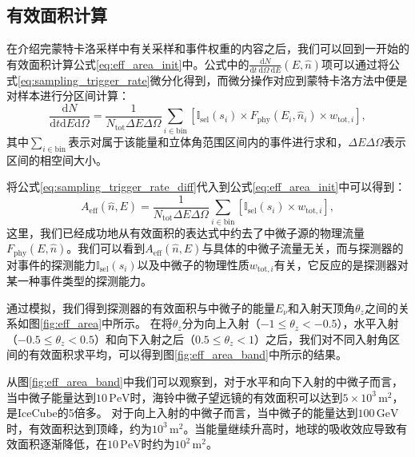 \subsection{有效面积计算}

在介绍完蒙特卡洛采样中有关采样和事件权重的内容之后，我们可以回到一开始的有效面积计算公式\ref{eq:eff_area_init}中。公式中的$\frac{\mathrm{d}N}{\mathrm{d}t ~\mathrm{d}\Omega ~\mathrm{d}E}(E, \hat{n})$项可以通过将公式\ref{eq:sampling_trigger_rate}微分化得到，而微分操作对应到蒙特卡洛方法中便是对样本进行分区间计算：
\begin{equation}
    \frac{\mathrm{d}N}{\mathrm{d}t \mathrm{d}E \mathrm{d}\Omega} = 
    \frac{1}{N_\mathrm{tot} \Delta E \Delta\Omega} \sum_{i \in \mathrm{bin}} \left[ 
    \mathbb{I}_\mathrm{sel}(s_i) \times 
    F_\mathrm{phy} (E_i, \hat{n}_i) \times
    w_{\mathrm{tot}, i} \right] ,
\label{eq:sampling_trigger_rate_diff}
\end{equation}
其中$\sum_{i \in \mathrm{bin}}$表示对属于该能量和立体角范围区间内的事件进行求和，$\Delta E \Delta\Omega$表示区间的相空间大小。

将公式\ref{eq:sampling_trigger_rate_diff}代入到公式\ref{eq:eff_area_init}中可以得到：
\begin{equation}
    A_\mathrm{eff} (\hat{n}, E) = \frac{1}{N_\mathrm{tot} \Delta E \Delta\Omega} \sum_{i \in \mathrm{bin}} \left[ 
    \mathbb{I}_\mathrm{sel}(s_i) \times 
    w_{\mathrm{tot}, i} \right] ,
    \label{eq:eff_area}
\end{equation}
这里，我们已经成功地从有效面积的表达式中约去了中微子源的物理流量$F_\mathrm{phy} (E, \hat{n})$。我们可以看到$A_\mathrm{eff} (\hat{n}, E)$与具体的中微子流量无关，而与探测器的对事件的探测能力$\mathbb{I}_\mathrm{sel}(s_i)$以及中微子的物理性质$w_{\mathrm{tot}, i}$有关，它反应的是探测器对某一种事件类型的探测能力。

通过模拟，我们得到探测器的有效面积与中微子的能量$E_\nu$和入射天顶角$\theta_z$之间的关系如图\ref{fig:eff_area}中所示。
在将$\theta_z$分为向上入射（$-1 \leq \theta_z < -0.5$），水平入射（$-0.5 \leq \theta_z < 0.5$）和向下入射之后（$0.5 \leq \theta_z < 1$）之后，我们对不同入射角区间的有效面积求平均，可以得到图\ref{fig:eff_area_band}中所示的结果。

从图\ref{fig:eff_area_band}中我们可以观察到，对于水平和向下入射的中微子而言，当中微子能量达到$10\,\mathrm{PeV}$时，海铃中微子望远镜的有效面积可以达到$5 \times 10^3\,\mathrm{m^2}$，是IceCube的5倍多\cite{IceCube_10yr_point_source:2019}。
对于向上入射的中微子而言，当中微子的能量达到$100\,\mathrm{GeV}$时，有效面积达到顶峰，约为$10^3\,\mathrm{m^2}$。当能量继续升高时，地球的吸收效应导致有效面积逐渐降低，在$10\,\mathrm{PeV}$时约为$10^2\,\mathrm{m}^2$。

